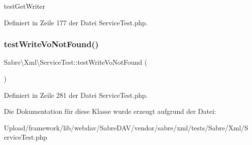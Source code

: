 test\+Get\+Writer 

Definiert in Zeile 177 der Datei Service\+Test.\+php.

\mbox{\label{class_sabre_1_1_xml_1_1_service_test_ac91805423e8067824379f13359dffa94}} 
\subsubsection{\texorpdfstring{test\+Write\+Vo\+Not\+Found()}{testWriteVoNotFound()}}
{\footnotesize\ttfamily Sabre\textbackslash{}\+Xml\textbackslash{}\+Service\+Test\+::test\+Write\+Vo\+Not\+Found (\begin{DoxyParamCaption}{ }\end{DoxyParamCaption})}



Definiert in Zeile 281 der Datei Service\+Test.\+php.



Die Dokumentation für diese Klasse wurde erzeugt aufgrund der Datei\+:\begin{DoxyCompactItemize}
\item 
Upload/framework/lib/webdav/\+Sabre\+D\+A\+V/vendor/sabre/xml/tests/\+Sabre/\+Xml/Service\+Test.\+php\end{DoxyCompactItemize}
